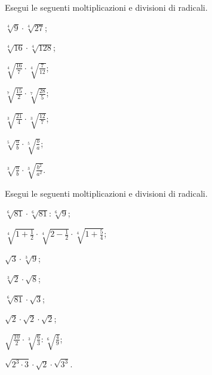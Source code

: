 \begin{esercizio}[\Ast]
 \label{ese:2.36}
Esegui le seguenti moltiplicazioni e divisioni di radicali.
 \begin{multicols}{3}
 \begin{enumeratea}
 \item $\sqrt[4]{9}\cdot\sqrt[4]{27}$;
 \item $\sqrt[4]{16}\cdot\sqrt[4]{128}$;
 \item $\sqrt[4]{\frac{16}{7}}\cdot\sqrt[4]{\frac{7}{12}}$;
 \item $\sqrt[7]{\frac{15}{2}}\cdot\sqrt[7]{\frac{28}{5}}$;
 \item $\sqrt[3]{\frac{21}{4}}\cdot\sqrt[3]{\frac{12}{7}}$;
 \item $\sqrt[5]{\frac{a}{b}}\cdot\sqrt[5]{\frac{b}{a}}$;
 \item $\sqrt[3]{\frac{a}{b}}\cdot\sqrt[3]{\frac{b^2}{a^2}}$.
 \end{enumeratea}
 \end{multicols}
\end{esercizio}

\begin{esercizio}[\Ast]
 \label{ese:2.37}
Esegui le seguenti moltiplicazioni e divisioni di radicali.
 \begin{multicols}{2}
 \begin{enumeratea}
 \item $\sqrt[6]{81}\cdot \sqrt[6]{81}:\sqrt[6]9$;
 \item $\sqrt[4]{1+\frac 1 2}\cdot \sqrt[4]{2-\frac 1 2}\cdot \sqrt[4]{1+\frac 5 4}$;
 \item $\sqrt 3\cdot \sqrt[3]9$;
 \item $\sqrt[3]2\cdot \sqrt 8$;
 \item $\sqrt[6]{81}\cdot \sqrt 3$;
 \item $\sqrt 2\cdot \sqrt 2\cdot\sqrt 2$;
 \item $\sqrt{\frac{10} 2}\cdot \sqrt[3]{\frac 6 3}:\sqrt[6]{\frac 4 9}$;
 \item $\sqrt{2^3\cdot 3}\cdot \sqrt 2\cdot \sqrt{3^3}$.
 \end{enumeratea}
 \end{multicols}
\end{esercizio}

